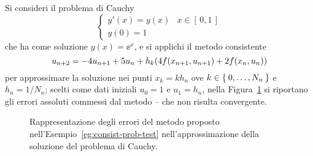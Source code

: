 	\begin{esempio}\label{eg:consist-prob-test}
		Si consideri il problema di Cauchy
		\begin{equation*}
			\begin{cases}
				y' (x) = y (x) & x \in [\, 0, 1 \,] \\
				y (0) = 1
			\end{cases}
		\end{equation*}
		che ha come soluzione \(y (x) = \ee^x\), e si applichi il metodo consistente
		\begin{equation*}
			u_{n + 2} = - 4 u_{n + 1} + 5 u_n + h_k \qty(4 f(x_{n + 1}, u_{n + 1}) + 2 f (x_n, u_n))
		\end{equation*}
		per approssimare la soluzione nei punti \(x_k = k h_n\) ove \(k \in \Set{0, \dots, N_n}\) e \(h_n = 1 / N_n\); scelti come dati iniziali \(u_0 = 1\) e \(u_1 = h_n\), nella Figura~\ref{fig:consist-prob-test} si riportano gli errori assoluti commessi dal metodo -- che non risulta convergente.
		
		\begin{figure}[tpb]
			\centering
			
			
			\caption{Rappresentazione degli errori del metodo proposto nell'Esempio~\ref{eg:consist-prob-test} nell'approssimazione della soluzione del problema di Cauchy.}\label{fig:consist-prob-test}
		\end{figure}
	\end{esempio}

